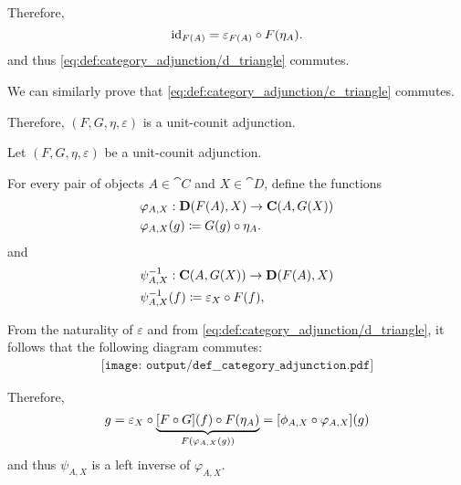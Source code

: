 \begin{defproof}
  Therefore,
  \begin{equation*}
    \id_{F(A)} = \varepsilon_{F(A)} \bincirc F(\eta_A).
  \end{equation*}
  and thus \eqref{eq:def:category_adjunction/d_triangle} commutes.

  We can similarly prove that \eqref{eq:def:category_adjunction/c_triangle} commutes.

  Therefore, \( (F, G, \eta, \varepsilon) \) is a unit-counit adjunction.

   Let \( (F, G, \eta, \varepsilon) \) be a unit-counit adjunction.

  For every pair of objects \( A \in \cat{C} \) and \( X \in \cat{D} \), define the functions
  \begin{equation*}
    \begin{aligned}
      &\varphi_{A,X}: \cat{D}(F(A), X) \to \cat{C}(A, G(X)) \\
      &\varphi_{A,X}(g) \coloneqq G(g) \bincirc \eta_A.
    \end{aligned}
  \end{equation*}
  and
  \begin{equation*}
    \begin{aligned}
      &\psi_{A,X}^{-1}: \cat{C}(A, G(X)) \to \cat{D}(F(A), X) \\
      &\psi_{A,X}^{-1}(f) \coloneqq \varepsilon_X \bincirc F(f),
    \end{aligned}
  \end{equation*}

  From the naturality of \( \varepsilon \) and from \eqref{eq:def:category_adjunction/d_triangle}, it follows that the following diagram commutes:
  \begin{equation}\label{eq:def:category_adjunction/varphi_inverse_def}
    \begin{aligned}
      \texttt{[image: output/def\_\_category\_adjunction.pdf]}
    \end{aligned}
  \end{equation}

  Therefore,
  \begin{equation*}
    g = \varepsilon_X \bincirc \underbrace{[F \bincirc G](f) \bincirc F(\eta_A)}_{F(\varphi_{A,X}(g))} = [\phi_{A,X} \bincirc \varphi_{A,X}](g)
  \end{equation*}
  and thus \( \psi_{A,X} \) is a left inverse of \( \varphi_{A,X} \).


\end{defproof}
